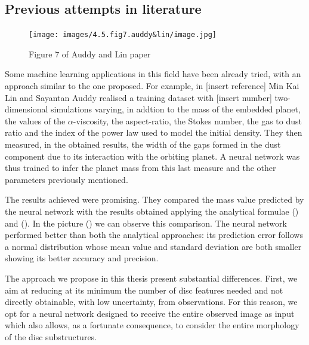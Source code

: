 \documentclass[a4paper,10pt]{report}
\begin{document}
\subsection{Previous attempts in literature}

\begin{figure}
    \begin{center}
        \texttt{[image: images/4.5.fig7.auddy\&lin/image.jpg]}
    \end{center}
    \caption{Figure 7 of Auddy and Lin paper}
\end{figure}

Some machine learning applications in this field have been already tried, 
with an approach similar to the one proposed. For example, in [insert reference]
Min Kai Lin and Sayantan Auddy realised a training dataset with [insert number] two-dimensional simulations varying, in addtion to the mass of the embedded planet, the values of the $\alpha$-viscosity, the aspect-ratio, the Stokes number, the gas to dust ratio and the index of the power law used to model 
the initial density. 
They then measured, in the obtained results, the width of the gaps formed in the
dust component due to its interaction with the orbiting planet. A neural network
was thus trained to infer the planet mass from this last measure and the other parameters previously mentioned.

The results achieved were promising. They compared the mass value predicted by the neural network
with the results obtained applying the analytical formulae () and ().
In the picture () we can observe this comparison.
The neural network performed better than both the analytical approaches: its prediction error
follows a normal distribution whose mean value and standard deviation are both smaller showing its
better accuracy and precision.

The approach we propose in this thesis present substantial differences. 
First, we aim at reducing at its minimum the number of disc features needed and not 
directly obtainable, with low uncertainty, from observations.
For this reason, we opt for a neural network designed to receive the entire
observed image as input which also allows, as a fortunate consequence, to consider the entire morphology of the disc substructures.
\end{document}
